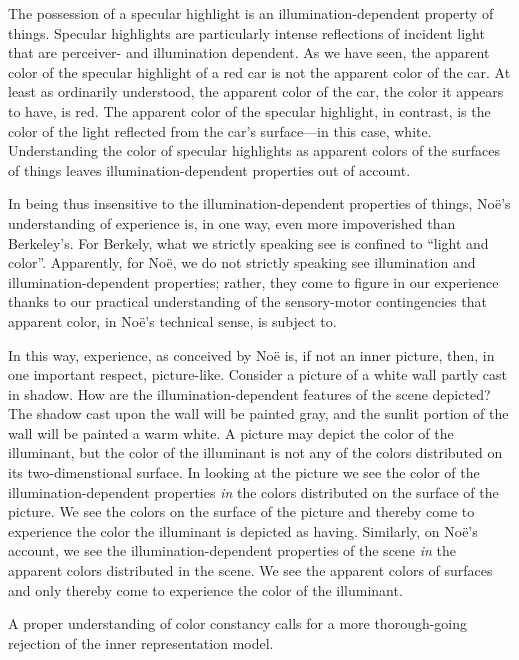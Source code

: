 \documentclass[12pt]{article}
\begin{document}
The possession of a specular highlight is an illumination-dependent property of things. Specular highlights are particularly intense reflections of incident light that are perceiver- and illumination dependent. As we have seen, the apparent color of the specular highlight of a red car is not the apparent color of the car. At least as ordinarily understood, the apparent color of the car, the color it appears to have, is red. The apparent color of the specular highlight, in contrast, is the color of the light reflected from the car's surface---in this case, white. Understanding the color of specular highlights as apparent colors of the surfaces of things leaves illumination-dependent properties out of account.

In being thus insensitive to the illumination-dependent properties of things, Noë's understanding of experience is, in one way, even more impoverished than Berkeley's. For Berkely, what we strictly speaking see is confined to ``light and color''. Apparently, for Noë, we do not strictly speaking see illumination and illumination-dependent properties; rather, they come to figure in our experience thanks to our practical understanding of the sensory-motor contingencies that apparent color, in Noë's technical sense, is subject to. 

In this way, experience, as conceived by Noë is, if not an inner picture, then, in one important respect, picture-like. Consider a picture of a white wall partly cast in shadow. How are the illumination-dependent features of the scene depicted? The shadow cast upon the wall will be painted gray, and the sunlit portion of the wall will be painted a warm white. A picture may depict the color of the illuminant, but the color of the illuminant is not any of the colors distributed on its two-dimenstional surface. In looking at the picture we see the color of the illumination-dependent properties \emph{in} the colors distributed on the surface of the picture. We see the colors on the surface of the picture and thereby come to experience the color the illuminant is depicted as having. Similarly, on Noë's account, we see the illumination-dependent properties of the scene \emph{in} the apparent colors distributed in the scene. We see the apparent colors of surfaces and only thereby come to experience the color of the illuminant. 

A proper understanding of color constancy calls for a more thorough-going rejection of the inner representation model.

\end{document}
